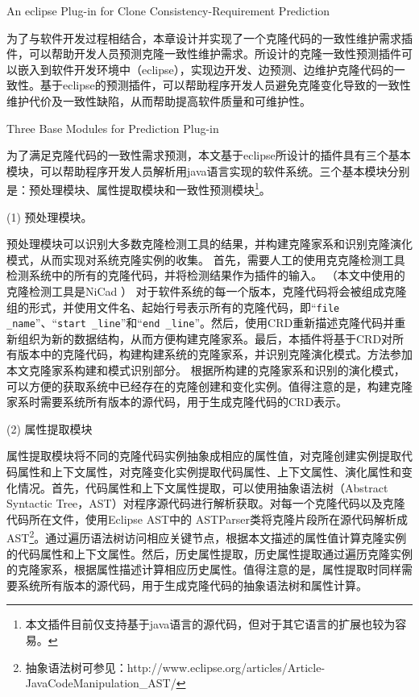 {An eclipse Plug-in for Clone Consistency-Requirement Prediction}

为了与软件开发过程相结合，本章设计并实现了一个克隆代码的一致性维护需求插件，可以帮助开发人员预测克隆一致性维护需求。所设计的克隆一致性预测插件可以嵌入到软件开发环境中（eclipse），实现边开发、边预测、边维护克隆代码的一致性。基于eclipse的预测插件，可以帮助程序开发人员避免克隆变化导致的一致性维护代价及一致性缺陷，从而帮助提高软件质量和可维护性。


{Three Base Modules for Prediction Plug-in }

为了满足克隆代码的一致性需求预测，本文基于eclipse所设计的插件具有三个基本模块，可以帮助程序开发人员解析用java语言实现的软件系统。三个基本模块分别是：预处理模块、属性提取模块和一致性预测模块\footnote{本文插件目前仅支持基于java语言的源代码，但对于其它语言的扩展也较为容易。}。%

(1) 预处理模块。

预处理模块可以识别大多数克隆检测工具的结果，并构建克隆家系和识别克隆演化模式，从而实现对系统克隆实例的收集。
首先，需要人工的使用克克隆检测工具检测系统中的所有的克隆代码，并将检测结果作为插件的输入。 （本文中使用的克隆检测工具是NiCad \cite {roy2008clone}）
对于软件系统的每一个版本，克隆代码将会被组成克隆组的形式，并使用文件名、起始行号表示所有的克隆代码，即“{\tt file \_name}”、“{\tt start \_line}”和“{\tt end \_line}”。然后，使用CRD重新描述克隆代码并重新组织为新的数据结构，从而方便构建克隆家系。最后，本插件将基于CRD对所有版本中的克隆代码，构建构建系统的克隆家系，并识别克隆演化模式。方法参加本文克隆家系构建和模式识别部分。
根据所构建的克隆家系和识别的演化模式，可以方便的获取系统中已经存在的克隆创建和变化实例。值得注意的是，构建克隆家系时需要系统所有版本的源代码，用于生成克隆代码的CRD表示。

(2) 属性提取模块

属性提取模块将不同的克隆代码实例抽象成相应的属性值，对克隆创建实例提取代码属性和上下文属性，对克隆变化实例提取代码属性、上下文属性、演化属性和变化情况。首先，代码属性和上下文属性提取，可以使用抽象语法树（Abstract Syntactic Tree，AST）对程序源代码进行解析获取。对每一个克隆代码以及克隆代码所在文件，使用Eclipse AST中的 ASTParser类将克隆片段所在源代码解析成AST\footnote{抽象语法树可参见：http://www.eclipse.org/articles/Article-JavaCodeManipulation\_AST/}。通过遍历语法树访问相应关键节点，根据本文描述的属性值计算克隆实例的代码属性和上下文属性。然后，历史属性提取，历史属性提取通过遍历克隆实例的克隆家系，根据属性描述计算相应历史属性。值得注意的是，属性提取时同样需要系统所有版本的源代码，用于生成克隆代码的抽象语法树和属性计算。%


